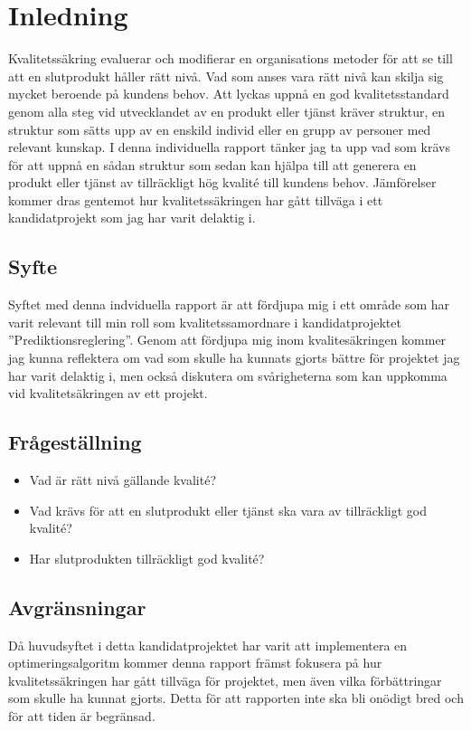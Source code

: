 \section{Inledning}
Kvalitetssäkring evaluerar och modifierar en organisations metoder för att se till att en slutprodukt håller rätt nivå. Vad som anses vara rätt nivå  kan skilja sig mycket beroende på kundens behov. 
\newline
\newline
Att lyckas uppnå en god kvalitetsstandard genom alla steg vid utvecklandet av en produkt eller tjänst kräver struktur, en struktur som sätts upp av en enskild individ eller en grupp av personer med relevant kunskap. I denna individuella rapport tänker jag ta upp vad som krävs för att uppnå en sådan struktur som sedan kan hjälpa till att generera en produkt eller tjänst av tillräckligt hög kvalité till kundens behov. Jämförelser kommer dras gentemot hur kvalitetssäkringen har gått tillväga i ett kandidatprojekt som jag har varit delaktig i.

\subsection{Syfte}
Syftet med denna indviduella rapport är att fördjupa mig i ett område som har varit relevant till min roll som kvalitetssamordnare i kandidatprojektet ''Prediktionsreglering''. 
\newline
\newline
Genom att fördjupa mig inom kvalitesäkringen kommer jag kunna reflektera om vad som skulle ha kunnats gjorts bättre för projektet jag har varit delaktig i, men också diskutera om svårigheterna som kan uppkomma vid kvalitetsäkringen av ett projekt.

\subsection{Frågeställning}

\begin{itemize}
  \item Vad är rätt nivå gällande kvalité?
  \item Vad krävs för att en slutprodukt eller tjänst ska vara av tillräckligt god kvalité?

  \item Har slutprodukten tillräckligt god kvalité?
\end{itemize}

\subsection{Avgränsningar}

Då huvudsyftet i detta kandidatprojektet har varit att implementera en optimeringsalgoritm kommer denna rapport främst fokusera på hur kvalitetssäkringen har gått tillväga för projektet, men även vilka förbättringar som skulle ha kunnat gjorts. Detta för att rapporten inte ska bli onödigt bred och för att tiden är begränsad.


